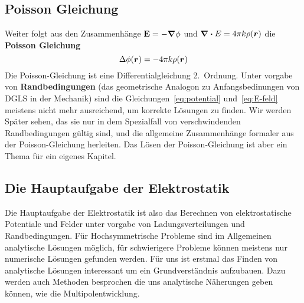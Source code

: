 \subsection{Poisson Gleichung}%
Weiter folgt aus den Zusammenhänge $\vb E = -\grad \phi$ und 
$\div E = 4\pi k \rho(\vb*r)$ die \textbf{Poisson Gleichung} 
\begin{equation}
  \Delta \phi(\vb*r) = - 4\pi k \rho(\vb*r)
\end{equation}
Die Poisson-Gleichung ist eine Differentialgleichung 2.\ Ordnung. Unter 
vorgabe von \textbf{Randbedingungen} (das geometrische Analogon zu Anfangsbedinungen von DGLS in der Mechanik) sind die Gleichungen~\ref{eq:potential} und~\ref{eq:E-feld} meistens nicht mehr ausreichend, um korrekte Lösungen zu finden. 
Wir werden Später sehen, das sie nur in dem Spezialfall von verschwindenden
Randbedingungen gültig sind, und die allgemeine Zusammenhänge formaler aus der Poisson-Gleichung herleiten.
Das Lösen der Poisson-Gleichung ist aber ein Thema für ein eigenes Kapitel. 

\subsection{Die Hauptaufgabe der Elektrostatik} 
Die Hauptaufgabe der Elektrostatik ist also das Berechnen von 
elektrostatische Potentiale und Felder unter vorgabe von 
Ladungsverteilungen und Randbedingungen. 
Für Hochsymmetrische Probleme sind im Allgemeinen analytische 
Lösungen möglich, für schwierigere Probleme können meistens nur numerische 
Lösungen gefunden werden. Für uns ist erstmal das Finden von analytische
Lösungen interessant um ein Grundverständnis aufzubauen. Dazu werden auch
Methoden besprochen die uns analytische Näherungen geben können, wie die
Multipolentwicklung.
